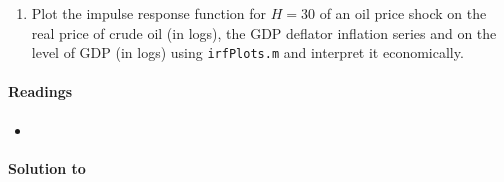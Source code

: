 \begin{enumerate}
\item Plot the impulse response function for \(H=30\) of an oil price shock on the real price of crude oil (in logs),
the GDP deflator inflation series and on the level of GDP (in logs) using \texttt{irfPlots.m} and interpret it economically.
\end{enumerate}

\paragraph{Readings}
\begin{itemize}
	\item \textcite[Ch.~8-9]{Kilian.Lutkepohl_2017_StructuralVectorAutoregressive}
\end{itemize}


\begin{solution}\textbf{Solution to }
\ifDisplaySolutions

\fi
\newpage
\end{solution}